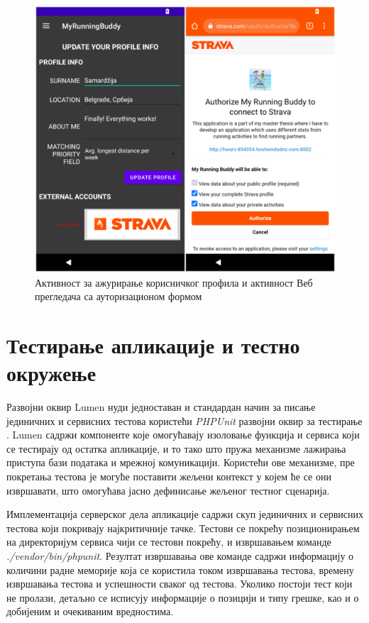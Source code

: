 \documentclass[12pt,oneside]{memoir}
\begin{document}
\begin{figure}[!ht]
  \centering
  \includegraphics[scale=0.7]{slike/azuriranje-autorizacija.png}
  \caption{Активност за ажурирање корисничког профила и активност Веб прегледача са ауторизационом формом}
  \label{fig:azuriranje_autorizacija}
\end{figure}

\section{Тестирање апликације и тестно окружење}
Развојни оквир Lumen нуди једноставан и стандардан начин за писање јединичних и сервисних тестова користећи \textit{PHPUnit} развојни оквир за тестирање \cite{phpunit}. Lumen садржи компоненте које омогућавају изоловање функција и сервиса који се тестирају од остатка апликације, и то тако што пружа механизме лажирања приступа бази података и мрежној комуникацији. Користећи ове механизме, пре покретања тестова је могуће поставити жељени контекст у којем ће се они извршавати, што омогућава јасно дефинисање жељеног тестног сценарија.

Имплементација серверског дела апликације садржи скуп јединичних и сервисних тестова који покривају најкритичније тачке. Тестови се покрећу позиционирањем на директоријум сервиса чији се тестови покрећу, и извршавањем команде \textit{./vendor/bin/phpunit}. Резултат извршавања ове команде садржи информацију о количини радне меморије која се користила током извршавања тестова, времену извршавања тестова и успешности сваког од тестова. Уколико постоји тест који не пролази, детаљно се исписују информације о позицији и типу грешке, као и о добијеним и очекиваним вредностима.
\end{document}
